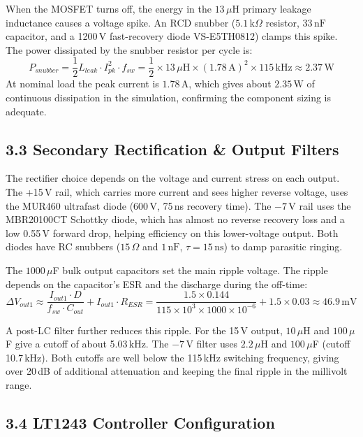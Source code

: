 When the MOSFET turns off, the energy in the $13\,\mu$H primary leakage inductance causes a voltage spike. An RCD snubber ($5.1\,\text{k}\Omega$ resistor, $33\,\text{nF}$ capacitor, and a 1200\,V fast-recovery diode VS-E5TH0812) clamps this spike. The power dissipated by the snubber resistor per cycle is:
\begin{equation}
P_{snubber} = \frac{1}{2} L_{leak} \cdot I_{pk}^2 \cdot f_{sw} = \frac{1}{2} \times 13\,\mu\text{H} \times (1.78\,\text{A})^2 \times 115\,\text{kHz} \approx 2.37\,\text{W}
\end{equation}
At nominal load the peak current is $1.78\,\text{A}$, which gives about $2.35\,\text{W}$ of continuous dissipation in the simulation, confirming the component sizing is adequate.

\subsection*{3.3 Secondary Rectification \& Output Filters}

The rectifier choice depends on the voltage and current stress on each output. The +15\,V rail, which carries more current and sees higher reverse voltage, uses the MUR460 ultrafast diode (600\,V, 75\,ns recovery time). The $-7$\,V rail uses the MBR20100CT Schottky diode, which has almost no reverse recovery loss and a low 0.55\,V forward drop, helping efficiency on this lower-voltage output. Both diodes have RC snubbers ($15\,\Omega$ and $1\,\text{nF}$, $\tau = 15\,\text{ns}$) to damp parasitic ringing.

The $1000\,\mu$F bulk output capacitors set the main ripple voltage. The ripple depends on the capacitor's ESR and the discharge during the off-time:
\begin{equation}
\Delta V_{out1} \approx \frac{I_{out1} \cdot D}{f_{sw} \cdot C_{out}} + I_{out1} \cdot R_{ESR} = \frac{1.5 \times 0.144}{115\times10^3 \times 1000\times10^{-6}} + 1.5 \times 0.03 \approx 46.9\,\text{mV}
\end{equation}

A post-LC filter further reduces this ripple. For the 15\,V output, $10\,\mu$H and $100\,\mu$F give a cutoff of about 5.03\,kHz. The $-7$\,V filter uses $2.2\,\mu$H and $100\,\mu$F (cutoff 10.7\,kHz). Both cutoffs are well below the 115\,kHz switching frequency, giving over 20\,dB of additional attenuation and keeping the final ripple in the millivolt range.

\subsection*{3.4 LT1243 Controller Configuration}

